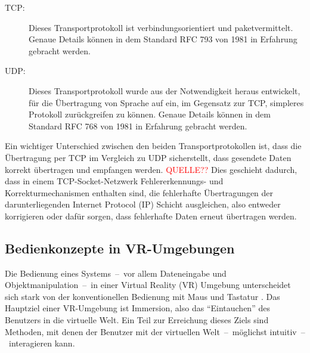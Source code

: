 \begin{description}
\item[TCP:] Dieses Transportprotokoll ist verbindungsorientiert und paketvermittelt. Genaue Details können in dem Standard RFC 793 \citep{rfc793} von 1981 in Erfahrung gebracht werden.

\item[UDP:] Dieses Transportprotokoll wurde aus der Notwendigkeit heraus entwickelt, für die Übertragung von Sprache auf ein, im Gegensatz zur TCP, simpleres Protokoll zurückgreifen zu können. Genaue Details können in dem Standard RFC 768 \citep{rfc768} von 1981 in Erfahrung gebracht werden.
\end{description}

Ein wichtiger Unterschied zwischen den beiden Transportprotokollen ist, dass die Übertragung per TCP im Vergleich zu UDP sicherstellt, dass gesendete Daten korrekt übertragen und empfangen werden. \textcolor{red}{QUELLE??} Dies geschieht dadurch, dass in einem TCP-Socket-Netzwerk Fehlererkennungs- und Korrekturmechanismen enthalten sind, die fehlerhafte Übertragungen der darunterliegenden Internet Protocol (IP) Schicht ausgleichen, also entweder korrigieren oder dafür sorgen, dass fehlerhafte Daten erneut übertragen werden.

\subsection{Bedienkonzepte in VR-Umgebungen}\label{sec:MenüAnwendungen}
Die Bedienung eines Systems~--~vor allem Dateneingabe und Objektmanipulation~--~in einer Virtual Reality (VR) Umgebung unterscheidet sich stark von der konventionellen Bedienung mit Maus und Tastatur \cite{chu1997multi}. Das Hauptziel einer VR-Umgebung ist Immersion, also das "`Eintauchen"' des Benutzers in die virtuelle Welt. Ein Teil zur Erreichung dieses Ziels sind Methoden, mit denen der Benutzer mit der virtuellen Welt~--~möglichst intuitiv~--~interagieren kann.

